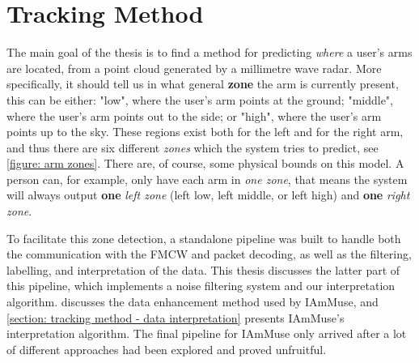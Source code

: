 \chapter{Tracking Method}
\label{chapter: tracking method}




The main goal of the thesis is to find a method for predicting \textit{where} a user's arms are located, from a point cloud generated by a millimetre wave radar.
More specifically, it should tell us in what general \textbf{zone} the arm is currently present, this can be either: 
"low", where the user's arm points at the ground;
"middle", where the user's arm points out to the side;
or "high", where the user's arm points up to the sky.
These regions exist both for the left and for the right arm, and thus there are six different \textit{zones} which the system tries to predict, see \cref{figure: arm zones}.
There are, of course, some physical bounds on this model. 
A person can, for example, only have each arm in \textit{one zone}, that means the system will always output \textbf{one} \textit{left zone} (left low, left middle, or left high) and \textbf{one} \textit{right zone}.

To facilitate this zone detection, a standalone pipeline was built to handle both the communication with the FMCW and packet decoding, as well as the filtering, labelling, and interpretation of the data. 
This thesis discusses the latter part of this pipeline, which implements a noise filtering system and our interpretation algorithm.
 discusses the data enhancement method used by IAmMuse, and \cref{section: tracking method - data interpretation} presents IAmMuse's interpretation algorithm.
The final pipeline for IAmMuse only arrived after a lot of different approaches had been explored and proved unfruitful.


